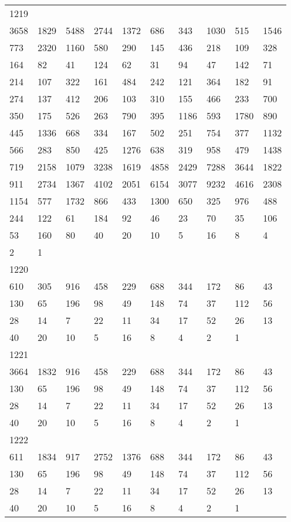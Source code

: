\begin{longtable}{*{10}{l}}
1219&&&&&&&&&\\
3658& 1829& 5488& 2744& 1372& 686& 343& 1030& 515& 1546\\
773& 2320& 1160& 580& 290& 145& 436& 218& 109& 328\\
164& 82& 41& 124& 62& 31& 94& 47& 142& 71\\
214& 107& 322& 161& 484& 242& 121& 364& 182& 91\\
274& 137& 412& 206& 103& 310& 155& 466& 233& 700\\
350& 175& 526& 263& 790& 395& 1186& 593& 1780& 890\\
445& 1336& 668& 334& 167& 502& 251& 754& 377& 1132\\
566& 283& 850& 425& 1276& 638& 319& 958& 479& 1438\\
719& 2158& 1079& 3238& 1619& 4858& 2429& 7288& 3644& 1822\\
911& 2734& 1367& 4102& 2051& 6154& 3077& 9232& 4616& 2308\\
1154& 577& 1732& 866& 433& 1300& 650& 325& 976& 488\\
244& 122& 61& 184& 92& 46& 23& 70& 35& 106\\
53& 160& 80& 40& 20& 10& 5& 16& 8& 4\\
2& 1& \\

1220&&&&&&&&&\\
610& 305& 916& 458& 229& 688& 344& 172& 86& 43\\
130& 65& 196& 98& 49& 148& 74& 37& 112& 56\\
28& 14& 7& 22& 11& 34& 17& 52& 26& 13\\
40& 20& 10& 5& 16& 8& 4& 2& 1& \\

1221&&&&&&&&&\\
3664& 1832& 916& 458& 229& 688& 344& 172& 86& 43\\
130& 65& 196& 98& 49& 148& 74& 37& 112& 56\\
28& 14& 7& 22& 11& 34& 17& 52& 26& 13\\
40& 20& 10& 5& 16& 8& 4& 2& 1& \\

1222&&&&&&&&&\\
611& 1834& 917& 2752& 1376& 688& 344& 172& 86& 43\\
130& 65& 196& 98& 49& 148& 74& 37& 112& 56\\
28& 14& 7& 22& 11& 34& 17& 52& 26& 13\\
40& 20& 10& 5& 16& 8& 4& 2& 1& \\


\end{longtable}
